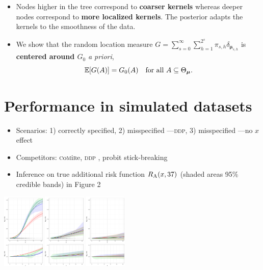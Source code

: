 \documentclass[a0,portrait]{a0poster}
\newcommand{\comirep}{\textsc{c}o\textsc{m}i\textsc{r}e}
\begin{document}
\begin{multicols}{2}
\begin{itemize}
\item Nodes higher in the tree correspond to \textbf{coarser kernels} whereas deeper nodes correspond to \textbf{more localized kernels}.
    The posterior adapts the kernels to the smoothness of the data.
\item We show that the random  location measure $G = \sum_{s=0}^{\infty }\sum_{h=1}^{2^s} \pi_{s,h} \delta_{\bm{\mu}_{s,h}}$ is \textbf{centered around $ G_0$} \textit{a priori},
    \[
        \mathbb{E}[G(A)] = G_0(A)\quad \text{for all $ A \subseteq \Theta_{\bm{\mu}}$}.
    \]
    

\end{itemize}
\color{DarkRed}
\vspace{-0.3cm}

\color{DarkRed}
\section*{Performance in simulated datasets}
\color{Black}
\begin{itemize}
\item Scenarios: 1) correctly specified, 2) misspecified ---\textsc{ddp}, 3) misspecified ---no $x$ effect
\item Competitors: {\color{blue} \comirep}, {\color{red}\textsc{ddp}} \citep{deio:etal}, {\color{green} probit stick-breaking} \citep{rodriguez:2011}
\item Inference on true additional risk function  $R_{\mbox{\textsc{a}}}(x,37)$ (shaded areas 95\% credible bands) in Figure 2
\end{itemize}

 \begin{center}\vspace{1cm}
\includegraphics[width=0.15\textwidth]{risk1_37}
\includegraphics[width=0.15\textwidth]{risk2_37}
\includegraphics[width=0.15\textwidth]{risk3_37}
\end{center}


\end{multicols}
\end{document}
